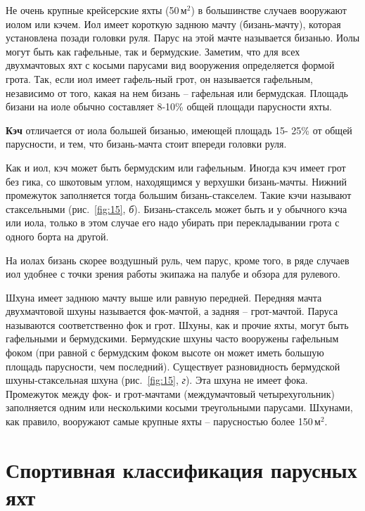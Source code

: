 \documentclass[a4paper, 12pt, twoside, final]{scrbook}
\begin{document}
Не очень крупные крейсерские яхты (50\,$\mbox{м}^2$) в большинстве случаев
вооружают иолом или кэчем. Иол имеет короткую заднюю мачту (бизань-мачту),
которая установлена позади головки руля. Парус на этой мачте называется
бизанью. Иолы могут быть как гафельные, так и бермудские. Заметим,
что для всех двухмачтовых яхт с косыми парусами вид вооружения определяется
формой грота. Так, если иол имеет гафель-ный грот, он называется гафельным,
независимо от того, какая на нем бизань \--- гафельная или бермудская.
Площадь бизани на иоле обычно составляет 8-10\% общей площади парусности
яхты. 

\textbf{Кэч} отличается от иола большей бизанью, имеющей площадь 15-
25\% от общей парусности, и тем, что бизань-мачта стоит впереди головки
руля.

Как и иол, кэч может быть бермудским или гафельным. Иногда кэч имеет
грот без гика, со шкотовым углом, находящимся у верхушки бизань-мачты.
Нижний промежуток заполняется тогда большим бизань-стакселем. Такие
кэчи называют стаксельными (рис.~\ref{fig:15},
\emph{б}). Бизань-стаксель может быть и у обычного кэча или иола,
только в этом случае его надо убирать при перекладывании грота с одного
борта на другой.

На иолах бизань скорее воздушный руль, чем парус, кроме того, в ряде
случаев иол удобнее с точки зрения работы экипажа на палубе и обзора
для рулевого.

Шхуна имеет заднюю мачту выше или равную передней. Передняя мачта
двухмачтовой шхуны называется фок-мачтой, а задняя \--- грот-мачтой.
Паруса называются соответственно фок и грот. Шхуны, как и прочие яхты,
могут быть гафельными и бермудскими. Бермудские шхуны часто вооружены
гафельным фоком (при равной с бермудским фоком высоте он может иметь
большую площадь парусности, чем последний). Существует разновидность
бермудской шхуны-стаксельная шхуна (рис.~\ref{fig:15},
\emph{г}). Эта шхуна не имеет фока. Промежуток между фок- и грот-мачтами
(междумачтовый четырехугольник) заполняется одним или несколькими
косыми треугольными парусами. Шхунами, как правило, вооружают самые
крупные яхты \--- парусностью более 150\,$\mbox{м}^2$.

%
%

\section{Спортивная классификация парусных яхт}
\end{document}
